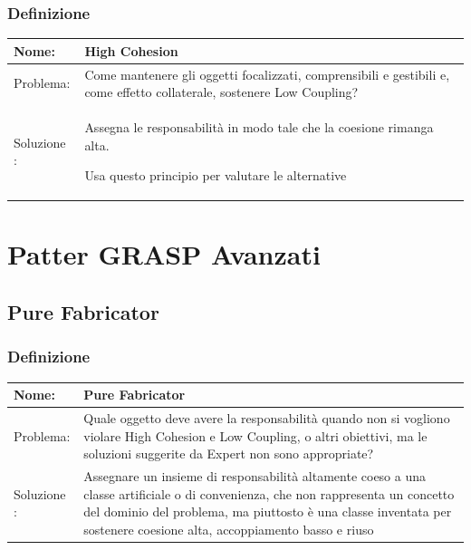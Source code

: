 \subsection{Definizione}
\begin{table}[htbp]
    \renewcommand{\arraystretch}{1.8}
    \begin{tabularx}{\textwidth}{@{} p{2.8cm} X @{}}
        \hline
        Nome: & \textbf{High Cohesion} \\
        \hline
        Problema: &  Come mantenere gli oggetti focalizzati, comprensibili e gestibili e, come effetto collaterale, sostenere Low Coupling?\\
        \hline
        Soluzione : &
        Assegna le responsabilità in modo tale che la coesione rimanga alta.

        Usa questo principio per valutare le alternative
        \\
        \hline
    \end{tabularx}
\end{table}

\chapter{Patter GRASP Avanzati}
\section{Pure Fabricator}
\subsection{Definizione}
\begin{table}[htbp]
    \renewcommand{\arraystretch}{1.8}
    \begin{tabularx}{\textwidth}{@{} p{2.8cm} X @{}}
        \hline
        Nome: & \textbf{Pure Fabricator} \\
        \hline
        Problema: &  Quale oggetto deve avere la responsabilità quando non si vogliono violare High Cohesion e Low Coupling, o altri obiettivi, ma le soluzioni suggerite da Expert non sono appropriate?\\
        \hline
        Soluzione : &
        Assegnare un insieme di responsabilità altamente coeso a una classe artificiale o di convenienza, che non rappresenta un concetto del dominio del problema, ma piuttosto è una classe inventata per sostenere coesione alta, accoppiamento basso e riuso
        \\
        \hline
    \end{tabularx}
\end{table}

